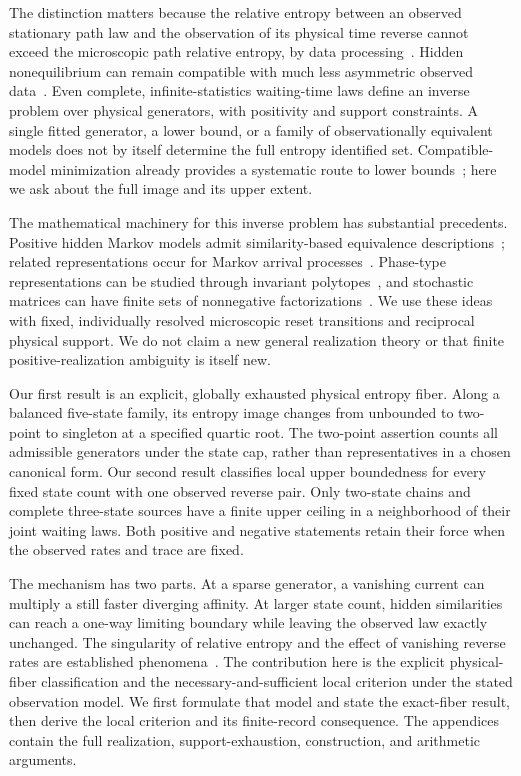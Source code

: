 \documentclass[aps,pre,onecolumn,11pt,longbibliography,notitlepage]{revtex4-2}
\newcommand{\1}{\mathbf 1}
\begin{document}
The distinction matters because the relative entropy between an observed stationary path law and the observation of its physical time reverse cannot exceed the microscopic path relative entropy, by data processing~\cite{vanDerMeer2022,Harunari2022}. Hidden nonequilibrium can remain compatible with much less asymmetric observed data~\cite{WagnerTimmer2000,Ehrich2021}. Even complete, infinite-statistics waiting-time laws define an inverse problem over physical generators, with positivity and support constraints. A single fitted generator, a lower bound, or a family of observationally equivalent models does not by itself determine the full entropy identified set. Compatible-model minimization already provides a systematic route to lower bounds~\cite{Ehrich2021,Nitzan2023}; here we ask about the full image and its upper extent.

The mathematical machinery for this inverse problem has substantial precedents. Positive hidden Markov models admit similarity-based equivalence descriptions~\cite{Vanluyten2008}; related representations occur for Markov arrival processes~\cite{HorvathTelek2007}. Phase-type representations can be studied through invariant polytopes~\cite{HeZhang2006}, and stochastic matrices can have finite sets of nonnegative factorizations~\cite{Mond2003}. We use these ideas with fixed, individually resolved microscopic reset transitions and reciprocal physical support. We do not claim a new general realization theory or that finite positive-realization ambiguity is itself new.

Our first result is an explicit, globally exhausted physical entropy fiber. Along a balanced five-state family, its entropy image changes from unbounded to two-point to singleton at a specified quartic root. The two-point assertion counts all admissible generators under the state cap, rather than representatives in a chosen canonical form. Our second result classifies local upper boundedness for every fixed state count with one observed reverse pair. Only two-state chains and complete three-state sources have a finite upper ceiling in a neighborhood of their joint waiting laws. Both positive and negative statements retain their force when the observed rates and trace are fixed.

The mechanism has two parts. At a sparse generator, a vanishing current can multiply a still faster diverging affinity. At larger state count, hidden similarities can reach a one-way limiting boundary while leaving the observed law exactly unchanged. The singularity of relative entropy and the effect of vanishing reverse rates are established phenomena~\cite{Zeraati2012,SasonVerdu2016}. The contribution here is the explicit physical-fiber classification and the necessary-and-sufficient local criterion under the stated observation model. We first formulate that model and state the exact-fiber result, then derive the local criterion and its finite-record consequence. The appendices contain the full realization, support-exhaustion, construction, and arithmetic arguments.
\end{document}
